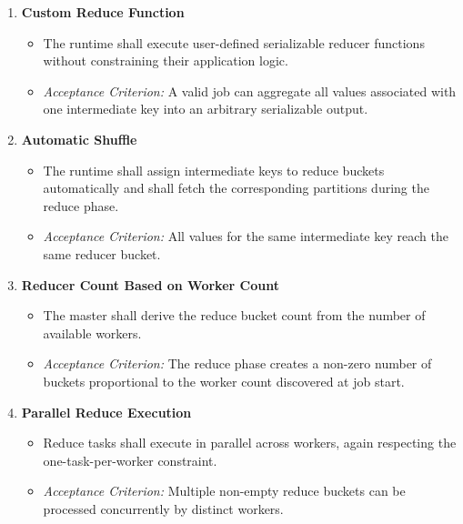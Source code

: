\documentclass{scrartcl}
\begin{document}
\begin{enumerate}[label=\textbf{FR-RED-\arabic*}]
    \item \textbf{Custom Reduce Function}
          \begin{itemize}
              \item The runtime shall execute user-defined serializable reducer functions without constraining their application logic.
              \item \textit{Acceptance Criterion:} A valid job can aggregate all values associated with one intermediate key into an arbitrary serializable output.
          \end{itemize}

    \item \textbf{Automatic Shuffle}
          \begin{itemize}
              \item The runtime shall assign intermediate keys to reduce buckets automatically and shall fetch the corresponding partitions during the reduce phase.
              \item \textit{Acceptance Criterion:} All values for the same intermediate key reach the same reducer bucket.
          \end{itemize}

    \item \textbf{Reducer Count Based on Worker Count}
          \begin{itemize}
              \item The master shall derive the reduce bucket count from the number of available workers.
              \item \textit{Acceptance Criterion:} The reduce phase creates a non-zero number of buckets proportional to the worker count discovered at job start.
          \end{itemize}

    \item \textbf{Parallel Reduce Execution}
          \begin{itemize}
              \item Reduce tasks shall execute in parallel across workers, again respecting the one-task-per-worker constraint.
              \item \textit{Acceptance Criterion:} Multiple non-empty reduce buckets can be processed concurrently by distinct workers.
          \end{itemize}
\end{enumerate}
\end{document}
